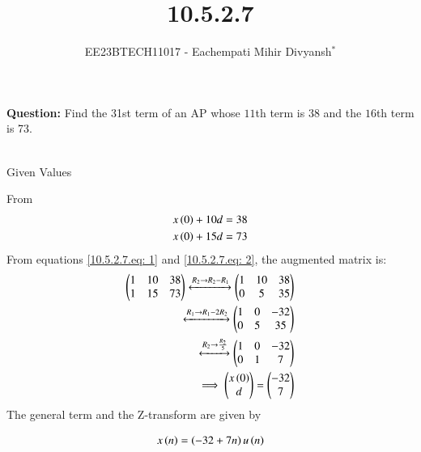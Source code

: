 \documentclass[journal,12pt,twocolumn]{IEEEtran}
\theoremstyle{remark}
\begin{document}

\vspace{3cm}

\title{10.5.2.7}
\author{EE23BTECH11017 - Eachempati Mihir Divyansh$^{*}$%
}
\maketitle
\newpage
\bigskip

\renewcommand{\thefigure}{\theenumi}
\renewcommand{\thetable}{\theenumi}

\textbf{Question:} Find the 31st term of an AP whose $11$th term is 38 and the $16$th term is 73.
\\
\solution
\\

\begin{table}[h]
    \centering
    
    \caption{Given Values}
    \label{tab:1}
\end{table}
From  
\begin{align}
x\left(0\right)+10d&=38\label{10.5.2.7.eq: 1}\\
x\left(0\right)+15d&=73 \label{10.5.2.7.eq: 2}
\end{align}
From  equations \ref{10.5.2.7.eq: 1} and \ref{10.5.2.7.eq: 2}, the augmented matrix is:
\begin{align}
 \begin{pmatrix}
   1 & 10 & 38
   \\
   1 & 15 & 73
 \end{pmatrix} 
 \xleftrightarrow[]{R_2 \rightarrow R_2-R_1} 
  \begin{pmatrix}
   1 & 10 & 38
   \\
   0 & 5 & 35
 \end{pmatrix} \\
 \xleftrightarrow[]{R_1 \rightarrow R_1-2R_2} 
  \begin{pmatrix}
   1 & 0 & -32
   \\
   0 & 5 & 35
 \end{pmatrix} \\
  \xleftrightarrow[]{R_2 \rightarrow \frac{R_2}{5}} 
  \begin{pmatrix}
   1 & 0 & -32
   \\
   0 & 1 & 7
 \end{pmatrix} \\
 \implies \begin{pmatrix}
   x\left(0\right)
   \\
   d
 \end{pmatrix}
 =
 \begin{pmatrix}
   -32
   \\
   7
 \end{pmatrix}
 \end{align}
 The general term and the Z-transform are given by

 \begin{align}
    x\left(n\right)&=\left(-32+7n\right)u\left(n\right)\\ 
 \end{align}
\end{document}
